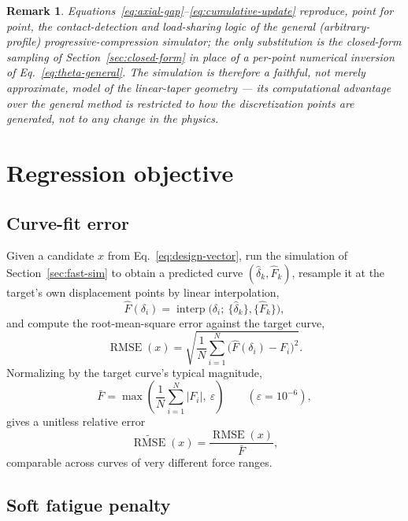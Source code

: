\documentclass[11pt]{article}
\newtheorem{remark}{Remark}
\DeclareMathOperator{\RMSE}{RMSE}
\begin{document}
\begin{remark}
Equations~\eqref{eq:axial-gap}--\eqref{eq:cumulative-update} reproduce,
point for point, the contact-detection and load-sharing logic of the
general (arbitrary-profile) progressive-compression simulator; the only
substitution is the closed-form sampling of
Section~\ref{sec:closed-form} in place of a per-point numerical inversion
of Eq.~\eqref{eq:theta-general}. The simulation is therefore a faithful,
not merely approximate, model of the linear-taper geometry — its
computational advantage over the general method is restricted to how the
discretization points are generated, not to any change in the physics.
\end{remark}

\section{Regression objective}
\label{sec:objective}

\subsection{Curve-fit error}

Given a candidate $x$ from Eq.~\eqref{eq:design-vector}, run the
simulation of Section~\ref{sec:fast-sim} to obtain a predicted curve
$(\hat\delta_k,\hat F_k)$, resample it at the target's own displacement
points by linear interpolation,
\begin{equation}
\hat F(\delta_i) = \operatorname{interp}\big(\delta_i;\ \{\hat\delta_k\},\{\hat F_k\}\big),
\end{equation}
and compute the root-mean-square error against the target curve,
\begin{equation}
\RMSE(x) = \sqrt{\frac{1}{N}\sum_{i=1}^N \big(\hat F(\delta_i) - F_i\big)^2}.
\label{eq:rmse}
\end{equation}
Normalizing by the target curve's typical magnitude,
\begin{equation}
\bar F = \max\!\left(\frac{1}{N}\sum_{i=1}^N |F_i|,\ \varepsilon\right)
\qquad (\varepsilon = 10^{-6}),
\end{equation}
gives a unitless relative error
\begin{equation}
\widetilde{\RMSE}(x) = \frac{\RMSE(x)}{\bar F},
\label{eq:norm-rmse}
\end{equation}
comparable across curves of very different force ranges.

\subsection{Soft fatigue penalty}
\end{document}
